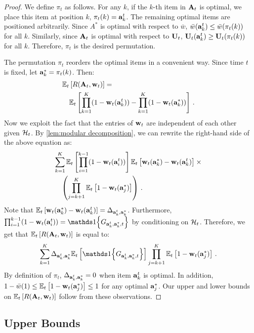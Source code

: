 \begin{proof}
We define $\pi_t$ as follows. For any $k$, if the $k$-th item in $\mathbf{A}_t$ is optimal, we place this item at position $k$, $\pi_t(k) = \mathbf{a}^t_k$. The remaining optimal items are positioned arbitrarily. Since $A^\ast$ is optimal with respect to $\bar{w}$, $\bar{w}(\mathbf{a}^t_k) \leq \bar{w}(\pi_t(k))$ for all $k$. Similarly, since $\mathbf{A}_t$ is optimal with respect to $\mathbf{U}_t$, $\mathbf{U}_t(\mathbf{a}^t_k) \geq \mathbf{U}_t(\pi_t(k))$ for all $k$. Therefore, $\pi_t$ is the desired permutation.

The permutation $\pi_t$ reorders the optimal items in a convenient way. Since time $t$ is fixed, let $\mathbf{a}^\ast_k = \pi_t(k)$. Then:
\begin{align*}
  & \mathbb{E}_t \left[R(\mathbf{A}_t, \mathbf{w}_t)\right] = \\
  & \quad \mathbb{E}_t \left[\prod_{k = 1}^K (1 - \mathbf{w}_t(\mathbf{a}^t_k)) - \prod_{k = 1}^K (1 - \mathbf{w}_t(\mathbf{a}^\ast_k))\right]\,.
\end{align*}
Now we exploit the fact that the entries of $\mathbf{w}_t$ are independent of each other given $\mathcal{H}_t$. By \cref{lem:modular decomposition}, we can rewrite the right-hand side of the above equation as:
\begin{align*}
  & \sum_{k = 1}^K \mathbb{E}_t \left[\prod_{i = 1}^{k - 1} (1 - \mathbf{w}_t(\mathbf{a}^t_i))\right]
  \mathbb{E}_t \left[\mathbf{w}_t(\mathbf{a}^\ast_k) - \mathbf{w}_t(\mathbf{a}^t_k)\right] \times {} \\
  & \quad \left(\prod_{j = k + 1}^K \mathbb{E}_t \left[1 - \mathbf{w}_t(\mathbf{a}^\ast_j)\right]\right)\,.
\end{align*}
Note that $\mathbb{E}_t \left[\mathbf{w}_t(\mathbf{a}^\ast_k) - \mathbf{w}_t(\mathbf{a}^t_k)\right] = \Delta_{\mathbf{a}^t_k, \mathbf{a}^\ast_k}$. Furthermore, $\prod_{i = 1}^{k - 1} (1 - \rnd{w}_t(\rnd{a}^t_i)) = \I{G_{\rnd{a}^t_k, \rnd{a}^\ast_k, t}}$ by conditioning on $\mathcal{H}_t$. Therefore, we get that $\mathbb{E}_t \left[R(\mathbf{A}_t, \mathbf{w}_t)\right]$ is equal to:
\begin{align*}
  \sum_{k = 1}^K \Delta_{\rnd{a}^t_k, \rnd{a}^\ast_k} \EEt{\I{G_{\rnd{a}^t_k, \rnd{a}^\ast_k, t}}}
  \prod_{j = k + 1}^K \EEt{1 - \rnd{w}_t(\rnd{a}^\ast_j)}\,.
\end{align*}
By definition of $\pi_t$, $\Delta_{\mathbf{a}^t_k, \mathbf{a}^\ast_k} = 0$ when item $\mathbf{a}^t_k$ is optimal. In addition, $1 - \bar{w}(1) \leq \mathbb{E}_t \left[1 - \mathbf{w}_t(\mathbf{a}^\ast_j)\right] \leq 1$ for any optimal $\mathbf{a}^\ast_j$. Our upper and lower bounds on $\mathbb{E}_t \left[R(\mathbf{A}_t, \mathbf{w}_t)\right]$ follow from these observations.
\end{proof}


\subsection{Upper Bounds}
\label{sec:upper bounds}

